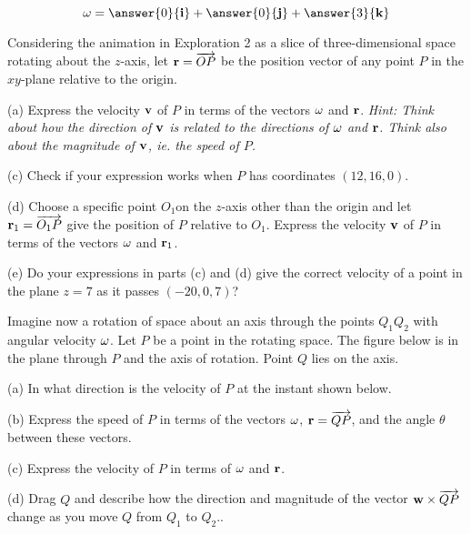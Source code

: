 \documentclass{ximera}
\begin{document}
\begin{question}  \label{Qhfnbyt:Cross}
\[
{\bf \omega} = \answer{0}{\bf i} + \answer{0}{\bf j} + \answer{3}{\bf k}
\]
\end{question}

\begin{question}  \label{Qnjy55:Cross}
Considering the animation in Exploration 2 as a slice of three-dimensional space rotating about the $z$-axis, let ${\bf r} = \overrightarrow{OP}$ be the position vector of any point $P$ in the $xy$-plane relative to the origin.

(a) Express the velocity ${\bf v}$ of $P$ in terms of the vectors ${\bf\omega}$ and ${\bf r}$. \it{Hint:} Think about how the direction of ${\bf v}$ is related to the directions of ${\bf \omega}$ and ${\bf r}$. Think also about the magnitude of ${\bf v}$, ie. the speed of $P$.

(c) Check if your expression works when $P$ has coordinates $(12, 16,0)$.

(d) Choose a specific point $O_1$on the $z$-axis other than the origin and let ${\bf r}_1 = \overrightarrow{O_1P}$ give the position of $P$ relative to $O_1$. Express the velocity ${\bf v}$ of $P$ in terms of the vectors ${\bf\omega}$ and ${\bf r}_1$. 


(e) Do your expressions in parts (c) and (d) give the correct velocity of a point in the plane $z=7$ as it passes $(-20,0,7)$?


\end{question}


\begin{question}  \label{Qdstjigvgf:Cross}
Imagine now a rotation of space about an axis through the points $Q_1Q_2$ with angular velocity ${\bf \omega}$. Let $P$ be a point in the rotating space. The figure below is in the plane through $P$ and the axis of rotation. Point $Q$ lies on the axis.

(a) In what direction is the velocity of $P$ at the instant shown below.

(b) Express the speed of $P$ in terms of the vectors ${\bf \omega}$, ${\bf r} = \overrightarrow{QP}$, and the angle $\theta$ between these vectors.

(c) Express the velocity of $P$ in terms of ${\bf \omega}$ and ${\bf r}$.

(d) Drag $Q$ and describe how the direction and magnitude of the vector ${\bf w}\times {\overrightarrow{QP}}$ change as you move $Q$ from $Q_1$ to $Q_2$..


 
\begin{onlineOnly}
    \begin{center}
\end{center}
\end{onlineOnly}

\end{question}
\end{document}
